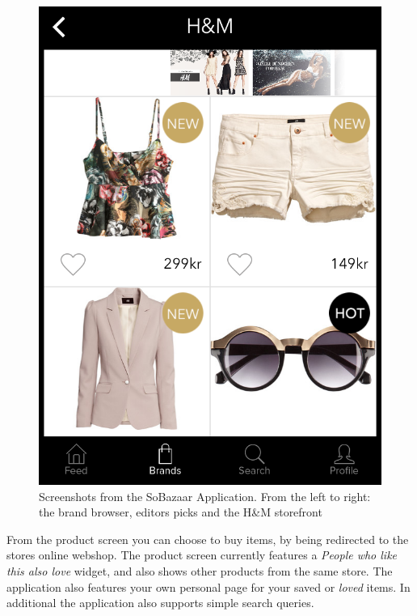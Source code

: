 \begin{figure}[H]
\begin{minipage}{.3\linewidth}
			  \includegraphics[height=1.5\linewidth]{image/SoBazaarStore.png}
		\end{minipage}
		\caption[SoBazaar storefront screenshots - version 0.5.1]{Screenshots from the SoBazaar Application. From the left to right: the brand browser, editors picks and the H\&M storefront}
		\label{figure:SoBazaarfeed}
	\end{figure}

	From the product screen you can choose to buy items, by being redirected to the stores online webshop. The product screen currently features a \emph{People who like this also love} widget, and also shows other products from the same store. The application also features your own personal page for your saved or \emph{loved} items. In additional the application
	also supports simple search queries.
	
